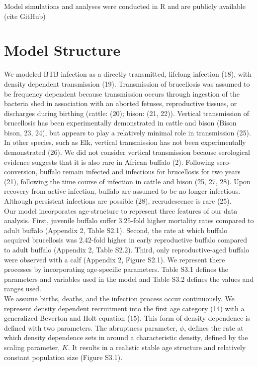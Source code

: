 \documentclass{article}
\begin{document}
Model simulations and analyses were conducted in R and are publicly available (cite GitHub)

\pagebreak

\section {Model Structure}
We modeled BTB infection as a directly transmitted, lifelong infection (18), with density dependent transmission (19). 
Transmission of brucellosis was assumed to be frequency dependent because transmission occurs through ingestion of the bacteria shed in association with an aborted fetuses, reproductive tissues, or discharges during birthing (cattle: (20); bison: (21, 22)). 
Vertical transmission of brucellosis has been experimentally demonstrated in cattle and bison (Bison bison, 23, 24), but appears to play a relatively minimal role in transmission (25). 
In other species, such as Elk, vertical transmission has not been experimentally demonstrated (26).  
We did not consider vertical transmission because serological evidence suggests that it is also rare in African buffalo (2). 
Following sero-conversion, buffalo remain infected and infectious for brucellosis for two years (21), following the time course of infection in cattle and bison (25, 27, 28).  
Upon recovery from active infection, buffalo are assumed to be no longer infectious. 
Although persistent infections are possible (28), recrudescence is rare (25).  \\

Our model incorporates age-structure to represent three features of our data analysis.  
First, juvenile buffalo suffer $3.25$-fold higher mortality rates compared to adult buffalo (Appendix 2, Table S2.1). 
Second, the rate at which buffalo acquired brucellosis was $2.42$-fold higher in early reproductive buffalo compared to adult buffalo (Appendix 2, Table S2.2). 
Third, only reproductive-aged buffalo were observed with a calf (Appendix 2, Figure S2.1).
We represent there processes by incorporating age-specific parameters. 
Table S3.1 defines the parameters and variables used in the model and Table S3.2 defines the values and ranges used.\\

We assume births, deaths, and the infection process occur continuously. 
We represent density dependent recruitment into the first age category (14) with a generalized Beverton and Holt equation (15). 
This form of density dependence is defined with two parameters.  
The abruptness parameter, $\phi$, defines the rate at which density dependence sets in around a characteristic density, defined by the scaling parameter, $K$. 
It results in a realistic stable age structure and relatively constant population size (Figure S3.1). 
\end{document}
